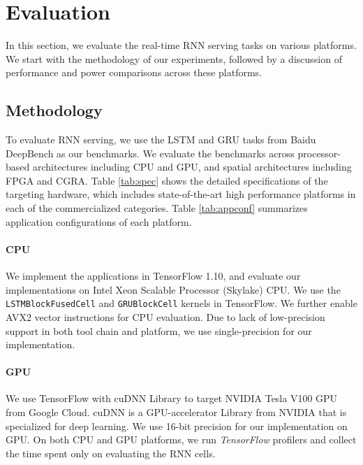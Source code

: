 \section{Evaluation} \label{sec:eval}
In this section, we evaluate the real-time RNN serving tasks on various platforms.
We start with the methodology of our experiments, followed by a discussion of performance and power comparisons across
these platforms.

\subsection{Methodology} \label{sec:methodology}
To evaluate RNN serving, we use the LSTM and GRU tasks from Baidu DeepBench as our benchmarks.
We evaluate the benchmarks across processor-based architectures including CPU and GPU, 
and spatial architectures including FPGA and CGRA.
Table \ref{tab:spec} shows the detailed specifications of the targeting hardware, 
which includes state-of-the-art high performance platforms in each of the commercialized categories.
Table \ref{tab:appconf} summarizes application configurations of each platform.

\paragraph{CPU} We implement the applications in TensorFlow 1.10, and evaluate our implementations on 
Intel Xeon Scalable Processor (Skylake) CPU.
We use the \texttt{LSTMBlockFusedCell} and \texttt{GRUBlockCell} kernels in TensorFlow.
We further enable AVX2 vector instructions for CPU evaluation. Due to lack of low-precision
support in both tool chain and platform, we use single-precision for our implementation.

\paragraph{GPU} We use TensorFlow with cuDNN Library to target NVIDIA Tesla V100 GPU from Google Cloud. 
cuDNN is a GPU-accelerator Library from NVIDIA that is specialized for deep learning.
We use 16-bit precision for our implementation on GPU.
On both CPU and GPU platforms, we run \emph{TensorFlow} profilers and collect the time spent 
only on evaluating the RNN cells.

